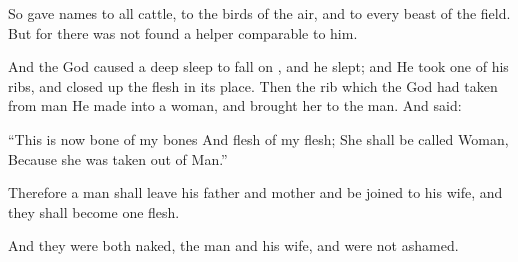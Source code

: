 \bverse So \Adam gave names to all cattle, to the birds of the air, and to every beast of the field. But for \Adam there was not found a helper comparable to him.

\bverse And the \lord God caused a deep sleep to fall on \Adam, and he slept; and He took one of his ribs, and closed up the flesh in its place.
\bverse Then the rib which the \lord God had taken from man He made into a woman, and brought her to the man.
\bverse And \Adam said: 
\begin{bquotation}
``This is now bone of my bones And flesh of my flesh; She shall be called Woman, Because she was taken out of Man.''
\end{bquotation}
\bverse Therefore a man shall leave his father and mother and be joined to his wife, and they shall become one flesh.

\bverse And they were both naked, the man and his wife, and were not ashamed.









